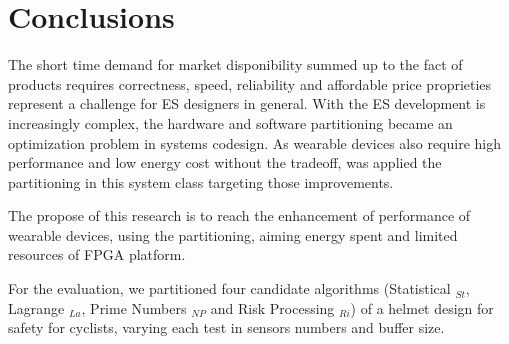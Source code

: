 \section{Conclusions} \label{chap:conclu}
    The short time demand for market disponibility summed up to the fact of products requires correctness, speed, reliability and affordable price proprieties represent a challenge for ES designers in general.
    With the ES development is increasingly complex, the hardware and software partitioning became an optimization problem in systems codesign.
    As wearable devices also require high performance and low energy cost without the tradeoff, was applied the partitioning in this system class targeting those improvements.
    
    The propose of this research is to reach the enhancement of performance of wearable devices, using the partitioning, aiming energy spent and limited resources of FPGA platform.
    
    
    For the evaluation, we partitioned four candidate algorithms (Statistical \A$_{St}$, Lagrange \A$_{La}$, Prime Numbers  \A$_{NP}$ and Risk Processing \A$_{Ri}$) of a helmet design for safety for cyclists, varying each test in sensors numbers and buffer size.
    
